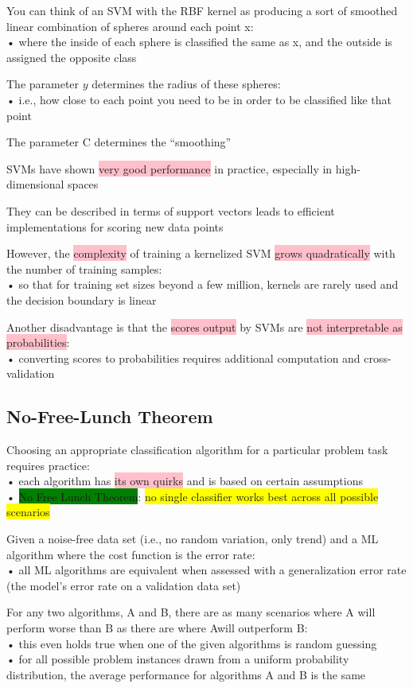 \documentclass[]{project_plan}
\begin{document}
You can think of an SVM with the RBF kernel as producing a sort of smoothed linear
combination of spheres around each point x:\\
• where the inside of each sphere is classified the same as x, and the outside is
assigned the opposite class

The parameter $y$ determines the radius of these spheres:\\
• i.e., how close to each point you need to be in order to be classified like that point

The parameter C determines the “smoothing”

SVMs have shown \colorbox{pink}{very good performance} in practice, especially in high-dimensional spaces

They can be described in terms of support vectors leads to efficient implementations
for scoring new data points

However, the \colorbox{pink}{complexity} of training a kernelized SVM \colorbox{pink}{grows quadratically} with the number of
training samples:\\
• so that for training set sizes beyond a few million, kernels are rarely used and the decision boundary is linear

Another disadvantage is that the \colorbox{pink}{scores output} by SVMs are \colorbox{pink}{not interpretable as probabilities}:\\
• converting scores to probabilities requires additional computation and cross-validation

\subsection{No-Free-Lunch Theorem}

Choosing an appropriate classification algorithm for a particular problem task requires practice:\\
• each algorithm has \colorbox{pink}{its own quirks} and is based on certain assumptions\\
• \colorbox{green}{No Free Lunch Theorem}: \colorbox{yellow}{no single classifier works best across all possible scenarios}

Given a noise-free data set (i.e., no random variation, only trend) and a ML algorithm where the
cost function is the error rate:\\
• all ML algorithms are equivalent when assessed with a generalization error rate (the model’s error rate on a
validation data set)

For any two algorithms, A and B, there are as many scenarios where A will perform worse than B
as there are where Awill outperform B:\\
• this even holds true when one of the given algorithms is random guessing\\
• for all possible problem instances drawn from a uniform probability distribution, the average performance for
algorithms A and B is the same
\end{document}
